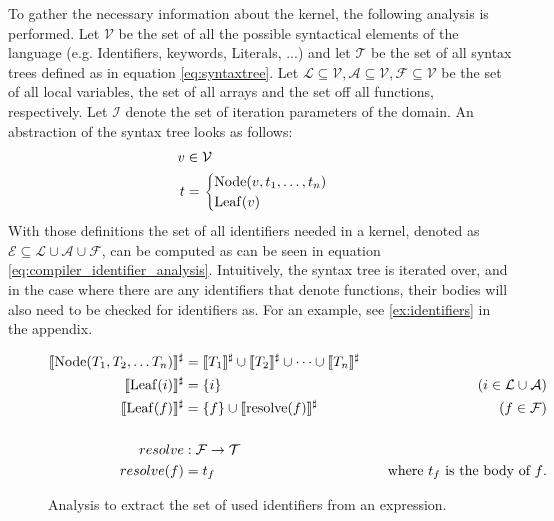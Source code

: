 To gather the necessary information about the kernel, the following analysis is performed. Let $\mathcal{V}$ be the set of all the possible syntactical elements of the language (e.g. Identifiers, keywords, Literals, ...) and let $\mathcal{T}$ be the set of all syntax trees defined as in equation \ref{eq:syntaxtree}. Let $\mathcal{L} \subseteq \mathcal{V}, \mathcal{A}\subseteq \mathcal{V}, \mathcal{F}\subseteq \mathcal{V}$ be the set of all local variables, the set of all arrays and the set off all functions, respectively. Let $\mathcal{I}$ denote the set of iteration parameters of the domain. An abstraction of the syntax tree looks as follows:
\begin{align}
v &\in \mathcal{V}\notag\\
t &=\begin{cases}
		\operatorname{Node}(v, t_1, \dotsc, t_n) \\
		\operatorname{Leaf}(v)
	\end{cases}
	\label{eq:syntaxtree}
\end{align}
With those definitions the set of all identifiers needed in a kernel, denoted as  $\mathcal{E} \subseteq \mathcal{L} \cup \mathcal{A} \cup \mathcal{F}$, can be computed as can be seen in equation \ref{eq:compiler_identifier_analysis}. Intuitively, the syntax tree is iterated over, and in the case where there are any identifiers that denote functions, their bodies will also need to be checked for identifiers as. For an example, see \ref{ex:identifiers} in the appendix.\\
\begin{figure}[H]
	\begin{align}
		\llbracket \operatorname{Node}(T_1, T_2, \dotsc T_n) \rrbracket^\sharp &= 
			\llbracket T_1\rrbracket^\sharp \cup \llbracket T_2 \rrbracket^\sharp \cup \dotsb \cup \llbracket T_n\rrbracket^\sharp &\quad \label{eq:compiler_identifier_analysis} \\
		\llbracket \operatorname{Leaf}(i) \rrbracket^\sharp &= 
			\{i\} &\quad (i \in \mathcal{L} \cup \mathcal{A}) \notag\\
		\llbracket \operatorname{Leaf}(f) \rrbracket^\sharp &= 
			\{f\} \cup \llbracket\operatorname{resolve}(f)\rrbracket^\sharp &\quad (f \in \mathcal{F}) \notag\\
		\quad&\quad&\quad \notag\\
		resolve &: \mathcal{F} \rightarrow \mathcal{T} &\quad \notag\\
		resolve (f) &= t_f &\quad \text{where $t_f$ is the body of $f$.} \notag
	\end{align}
	\caption{Analysis to extract the set of used identifiers from an expression.}
\end{figure}

